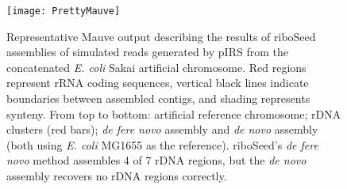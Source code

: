 \begin{figure}[!b]
    \centering
    \hspace*{-.7cm}\texttt{[image: PrettyMauve]}
    \caption{Representative Mauve output describing the results of riboSeed assemblies of simulated reads generated by pIRS from the concatenated \textit{E. coli} Sakai artificial chromosome. Red regions represent rRNA coding sequences, vertical black lines indicate boundaries between assembled contigs, and shading represents synteny. From top to bottom: artificial reference chromosome; rDNA clusters (red bars); \textit{de fere novo} assembly and \textit{de novo} assembly (both using \textit{E. coli } MG1655 as the reference). riboSeed's \textit{de fere novo} method assembles 4 of 7 rDNA regions, but the \textit{de novo} assembly recovers no rDNA regions correctly.
}
\label{fig:artificial}
\end{figure}

